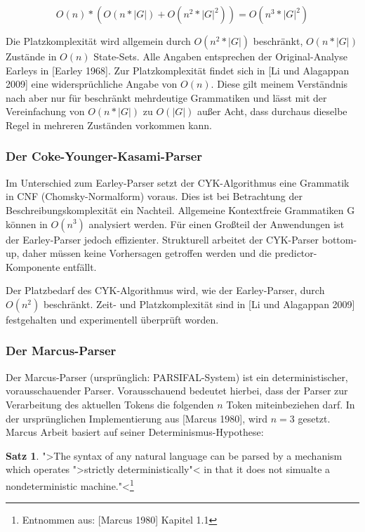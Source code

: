 \documentclass[12pt,a4paper]{article}
\theoremstyle{definition}
\begin{document}
				$$O(n)*(O(n*|G|)+O(n^2*|G|^2)) = O(n^3*|G|^2)$$
			
			Die Platzkomplexität wird allgemein durch $O(n^2*|G|)$ beschränkt, $O(n*|G|)$ Zustände in $O(n)$ State-Sets. Alle Angaben entsprechen der Original-Analyse Earleys in [Earley 1968]. Zur Platzkomplexität findet sich in [Li und Alagappan 2009] eine widersprüchliche Angabe von $O(n)$. Diese gilt meinem Verständnis nach aber nur für beschränkt mehrdeutige Grammatiken und lässt mit der Vereinfachung von $O(n*|G|)$ zu $O(|G|)$ außer Acht, dass durchaus dieselbe Regel in mehreren Zuständen vorkommen kann.
		
		\subsubsection{Der Coke-Younger-Kasami-Parser}
			Im Unterschied zum Earley-Parser setzt der CYK-Algorithmus eine Grammatik in CNF (Chomsky-Normalform) voraus. Dies ist bei Betrachtung der Beschreibungskomplexität ein Nachteil. Allgemeine Kontextfreie Grammatiken G können in  $O(n^3)$ analysiert werden. Für einen Großteil der Anwendungen ist der Earley-Parser jedoch effizienter. Strukturell arbeitet der CYK-Parser bottom-up, daher müssen keine Vorhersagen getroffen werden und die predictor-Komponente entfällt.
		
			Der Platzbedarf des CYK-Algorithmus wird, wie der Earley-Parser, durch $O(n^2)$ beschränkt. Zeit- und Platzkomplexität sind in [Li und Alagappan 2009] festgehalten und experimentell überprüft worden.
		
		\subsubsection{Der Marcus-Parser}
			Der Marcus-Parser (ursprünglich: PARSIFAL-System) ist ein deterministischer, vorausschauender Parser. Vorausschauend bedeutet hierbei, dass der Parser zur Verarbeitung des aktuellen Tokens die folgenden $n$ Token miteinbeziehen darf. In der ursprünglichen Implementierung aus [Marcus 1980], wird $n=3$ gesetzt. Marcus Arbeit basiert auf seiner Determinismus-Hypothese:
		
				\newtheorem{det-hypothesis}{Satz}[subsubsection]
				\begin{det-hypothesis}
					">The syntax of any natural language can be parsed by a mechanism which operates ">strictly deterministically"< in that it does not simualte a nondeterministic machine."<\footnote{Entnommen aus: [Marcus 1980] Kapitel 1.1}
				\end{det-hypothesis}
				
\end{document}
